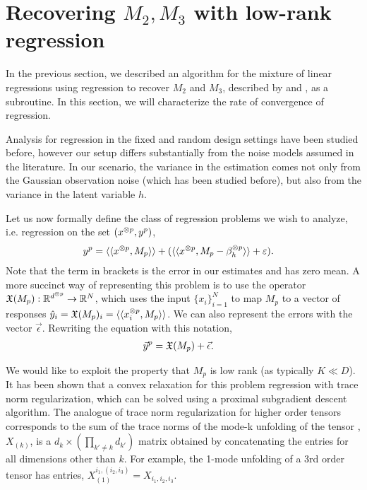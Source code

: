 \section{Recovering $M_2, M_3$ with low-rank regression}
\label{sec:regression}

In the previous section, we described an algorithm for the mixture of
linear regressions using regression to recover $M_2$ and $M_3$,
described by  and , as
a subroutine. In this section, we will characterize the rate of
convergence of regression.

Analysis for regression in the fixed and random design settings have
been studied before\citep{HsuKakadeZhang}, however our setup differs
substantially from the noise models assumed in the literature. In our
scenario, the variance in the estimation comes not only from the
Gaussian observation noise (which has been studied before), but also
from the variance in the latent variable $h$.

Let us now formally define the class of regression problems we wish to
analyze, i.e. regression on the set $(x^{\otimes p}, y^p)$,
\begin{align*}
  y^p &= \langle\langle x^{\otimes p}, M_p \rangle\rangle + (\langle\langle x^{\otimes p}, M_p - \beta_h^{\otimes p} \rangle\rangle + \varepsilon).
\end{align*}
Note that the term in brackets is the error in our estimates and has
zero mean.  A more succinct way of representing this problem is to use
the operator $\operatorname{\mathfrak{X}}(M_p) : \mathbb{R}^{d^{\otimes p}} \to \mathbb{R}^{N}$, which uses the
input $\{ x_i \}_{i=1}^{N}$ to map $M_p$ to a vector of responses $\hat
y_i = \operatorname{\mathfrak{X}}(M_p)_i = \langle\langle x_i^{\otimes p}, M_p \rangle\rangle$. We can also represent the
errors with the vector $\vec \epsilon$. Rewriting the equation with this notation, 
\begin{align*}
  \vec y^p &= \operatorname{\mathfrak{X}}(M_p) + \vec \epsilon.
\end{align*}

 We would like to exploit
the property that $M_p$ is low rank (as typically $K \ll D$). It has
been shown that a convex relaxation for this problem regression with
trace norm regularization, which can be solved using a proximal
subgradient descent algorithm\citationneeded. The analogue of trace norm
regularization for higher order tensors corresponds to the sum of the
trace norms of the mode-k unfolding of the tensor \cite{Tomioka2011},
$X_{(k)}$, is a $d_k \times (\prod_{k' \neq k} d_{k'})$ matrix obtained
by concatenating the entries for all dimensions other than $k$. For
example, the 1-mode unfolding of a 3rd order tensor has entries,
$X_{(1)}^{i_1, (i_2, i_3)} = X_{i_1, i_2, i_3}$.

